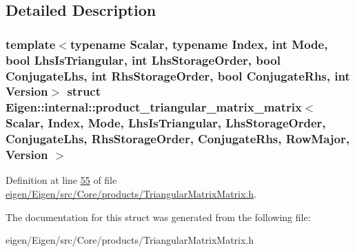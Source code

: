 \subsection{Detailed Description}
\subsubsection*{template$<$typename Scalar, typename Index, int Mode, bool Lhs\+Is\+Triangular, int Lhs\+Storage\+Order, bool Conjugate\+Lhs, int Rhs\+Storage\+Order, bool Conjugate\+Rhs, int Version$>$\newline
struct Eigen\+::internal\+::product\+\_\+triangular\+\_\+matrix\+\_\+matrix$<$ Scalar, Index, Mode, Lhs\+Is\+Triangular, Lhs\+Storage\+Order, Conjugate\+Lhs, Rhs\+Storage\+Order, Conjugate\+Rhs, Row\+Major, Version $>$}



Definition at line \hyperlink{eigen_2_eigen_2src_2_core_2products_2_triangular_matrix_matrix_8h_source_l00055}{55} of file \hyperlink{eigen_2_eigen_2src_2_core_2products_2_triangular_matrix_matrix_8h_source}{eigen/\+Eigen/src/\+Core/products/\+Triangular\+Matrix\+Matrix.\+h}.



The documentation for this struct was generated from the following file\+:\begin{DoxyCompactItemize}
\item 
eigen/\+Eigen/src/\+Core/products/\+Triangular\+Matrix\+Matrix.\+h\end{DoxyCompactItemize}
